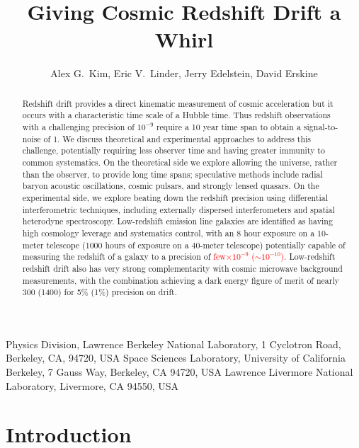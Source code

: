 \documentclass[preprint2, 10pt]{aastex}
\begin{document}
\title{Giving Cosmic Redshift Drift a Whirl} 
\author{Alex G.\ Kim, Eric V.\ Linder, Jerry Edelstein, David Erskine}
{
Physics Division, Lawrence Berkeley National Laboratory, 1 Cyclotron Road, Berkeley, CA, 94720, USA}
{
Space Sciences Laboratory, University of California Berkeley, 7 Gauss Way, Berkeley, CA 94720, USA
}
{
Lawrence Livermore National Laboratory, Livermore,
CA 94550, USA
} 

\begin{abstract} 
Redshift drift provides a direct kinematic measurement of cosmic acceleration 
but it occurs with a characteristic time scale of a Hubble time.  Thus 
redshift observations with a challenging precision of $10^{-9}$ require a 
10 year time span to obtain a signal-to-noise of 1. We discuss theoretical 
and experimental approaches to address this challenge, potentially requiring 
less observer time and having greater immunity to common systematics.  On 
the theoretical side we explore allowing the universe, rather than the 
observer, to provide long time spans; speculative methods include radial 
baryon acoustic oscillations, cosmic pulsars, and strongly lensed quasars. 
On the experimental side, we explore beating down the redshift precision 
using differential interferometric techniques, including externally 
dispersed interferometers and spatial heterodyne spectroscopy. Low-redshift
emission line galaxies are identified as having high cosmology 
leverage and systematics control, with an 8 hour exposure on a 10-meter 
telescope (1000 hours of exposure on a 40-meter telescope) potentially 
capable of measuring the redshift of a galaxy to a precision 
of \textcolor{red}{
few$\times 10^{-9}$ 
($\sim 10^{-10}$).} Low-redshift redshift drift also has very strong 
complementarity with cosmic microwave background measurements, with the 
combination achieving a dark energy figure of merit of nearly 300 (1400) 
for 5\% (1\%) precision on drift. 
\end{abstract}




\section{Introduction} \label{Sec:intro} 
\end{document}
